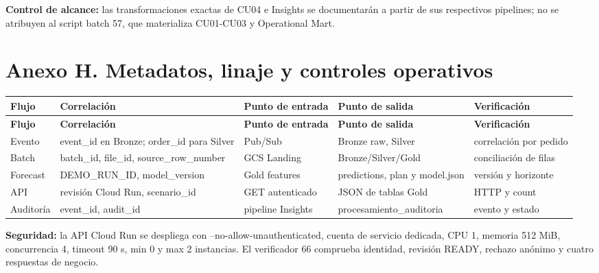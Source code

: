 \documentclass[11pt]{article}
\begin{document}
\textbf{Control de alcance:} las transformaciones exactas de CU04 e Insights se documentarán a partir de sus respectivos pipelines; no se atribuyen al script batch 57, que materializa CU01-CU03 y Operational Mart.\par




\clearpage
\section*{Anexo H. Metadatos, linaje y controles operativos}

\begingroup\small
\begin{longtable}{@{}>{\raggedright\arraybackslash}p{}>{\raggedright\arraybackslash}p{}>{\raggedright\arraybackslash}p{}>{\raggedright\arraybackslash}p{}>{\raggedright\arraybackslash}p{}@{}}
\toprule
\textbf{Flujo} & \textbf{Correlación} & \textbf{Punto de entrada} & \textbf{Punto de salida} & \textbf{Verificación} \\
\midrule
\endfirsthead
\toprule
\textbf{Flujo} & \textbf{Correlación} & \textbf{Punto de entrada} & \textbf{Punto de salida} & \textbf{Verificación} \\
\midrule
\endhead
Evento & event\_\allowbreak{}id en Bronze; order\_\allowbreak{}id para Silver & Pub/\allowbreak{}Sub & Bronze raw, Silver & correlación por pedido \\
Batch & batch\_\allowbreak{}id, file\_\allowbreak{}id, source\_\allowbreak{}row\_\allowbreak{}number & GCS Landing & Bronze/\allowbreak{}Silver/\allowbreak{}Gold & conciliación de filas \\
Forecast & DEMO\_\allowbreak{}RUN\_\allowbreak{}ID, model\_\allowbreak{}version & Gold features & predictions, plan y model.json & versión y horizonte \\
API & revisión Cloud Run, scenario\_\allowbreak{}id & GET autenticado & JSON de tablas Gold & HTTP y count \\
Auditoría & event\_\allowbreak{}id, audit\_\allowbreak{}id & pipeline Insights & procesamiento\_\allowbreak{}auditoria & evento y estado \\
\bottomrule
\end{longtable}
\endgroup

\textbf{Seguridad:} la API Cloud Run se despliega con --no-allow-unauthenticated, cuenta de servicio dedicada, CPU 1, memoria 512 MiB, concurrencia 4, timeout 90 s, min 0 y max 2 instancias. El verificador 66 comprueba identidad, revisión READY, rechazo anónimo y cuatro respuestas de negocio.\par
\end{document}
